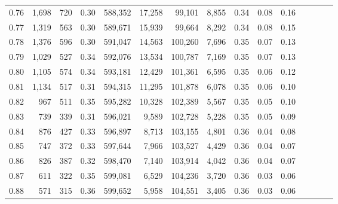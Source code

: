 \begin{tabular}{rrrcrrrrrrrrrrr}
0.76 &   1,698 &    720 &                                       0.30 &  588,352 &   17,258 &   99,101 &    8,855 &  0.34 &  0.08 &                         0.16 \\
0.77 &   1,319 &    563 &                                       0.30 &  589,671 &   15,939 &   99,664 &    8,292 &  0.34 &  0.08 &                         0.15 \\
0.78 &   1,376 &    596 &                                       0.30 &  591,047 &   14,563 &  100,260 &    7,696 &  0.35 &  0.07 &                         0.13 \\
0.79 &   1,029 &    527 &                                       0.34 &  592,076 &   13,534 &  100,787 &    7,169 &  0.35 &  0.07 &                         0.13 \\
0.80 &   1,105 &    574 &                                       0.34 &  593,181 &   12,429 &  101,361 &    6,595 &  0.35 &  0.06 &                         0.12 \\
0.81 &   1,134 &    517 &                                       0.31 &  594,315 &   11,295 &  101,878 &    6,078 &  0.35 &  0.06 &                         0.10 \\
0.82 &     967 &    511 &                                       0.35 &  595,282 &   10,328 &  102,389 &    5,567 &  0.35 &  0.05 &                         0.10 \\
0.83 &     739 &    339 &                                       0.31 &  596,021 &    9,589 &  102,728 &    5,228 &  0.35 &  0.05 &                         0.09 \\
0.84 &     876 &    427 &                                       0.33 &  596,897 &    8,713 &  103,155 &    4,801 &  0.36 &  0.04 &                         0.08 \\
0.85 &     747 &    372 &                                       0.33 &  597,644 &    7,966 &  103,527 &    4,429 &  0.36 &  0.04 &                         0.07 \\
0.86 &     826 &    387 &                                       0.32 &  598,470 &    7,140 &  103,914 &    4,042 &  0.36 &  0.04 &                         0.07 \\
0.87 &     611 &    322 &                                       0.35 &  599,081 &    6,529 &  104,236 &    3,720 &  0.36 &  0.03 &                         0.06 \\
0.88 &     571 &    315 &                                       0.36 &  599,652 &    5,958 &  104,551 &    3,405 &  0.36 &  0.03 &                         0.06 \\

\end{tabular}
